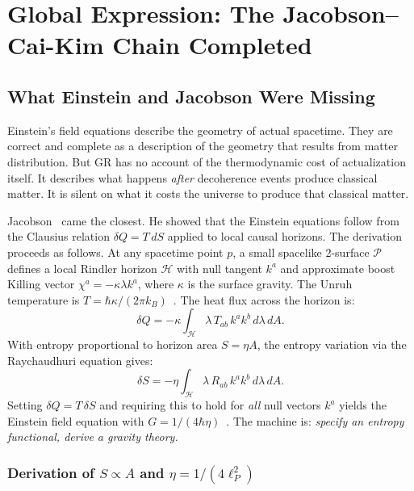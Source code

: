 \documentclass[12pt,a4paper]{article}
\begin{document}
\section{Global Expression: The Jacobson--Cai-Kim Chain Completed}
\label{sec:global}

\subsection{What Einstein and Jacobson Were Missing}

Einstein's field equations describe the geometry of actual spacetime.
They are correct and complete as a description of the geometry that
results from matter distribution. But GR has no account of the
thermodynamic cost of actualization itself. It describes what happens
\textit{after} decoherence events produce classical matter. It is
silent on what it costs the universe to produce that classical matter.

Jacobson~\citep{Jacobson1995} came the closest. He showed that the
Einstein equations follow from the Clausius relation $\delta Q = T\,dS$
applied to local causal horizons. The derivation proceeds as follows.
At any spacetime point $p$, a small spacelike 2-surface $\mathcal{P}$
defines a local Rindler horizon $\mathcal{H}$ with null tangent $k^a$
and approximate boost Killing vector $\chi^a = -\kappa\lambda k^a$,
where $\kappa$ is the surface gravity. The Unruh temperature is
$T = \hbar\kappa/(2\pi k_B)$~\citep{Unruh1976}. The heat flux across
the horizon is:
\begin{equation}
\delta Q = -\kappa \int_\mathcal{H}
\lambda\,T_{ab}\,k^a k^b\,d\lambda\,dA.
\label{eq:heat_flux}
\end{equation}
With entropy proportional to horizon area $S = \eta A$, the entropy
variation via the Raychaudhuri equation gives:
\begin{equation}
\delta S = -\eta \int_\mathcal{H}
\lambda\,R_{ab}\,k^a k^b\,d\lambda\,dA.
\label{eq:dS_jacobson}
\end{equation}
Setting $\delta Q = T\,\delta S$ and requiring this to hold for
\textit{all} null vectors $k^a$ yields the Einstein field equation
with $G = 1/(4\hbar\eta)$~\citep{Jacobson1995}. The machine is:
\textit{specify an entropy functional, derive a gravity theory.}

\subsubsection*{Derivation of $S \propto A$ and $\eta = 1/(4\ell_P^2)$}
\end{document}
